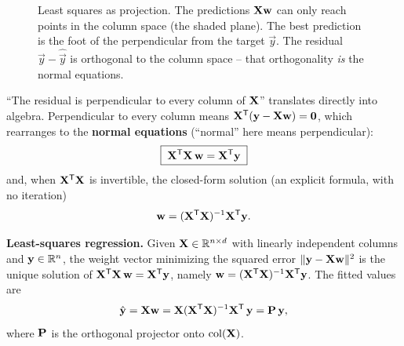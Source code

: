 \begin{figure}[htbp]
\centering
{}
\caption{Least squares as projection. The predictions $\mathbf{X}\mathbf{w}$ can only reach
points in the column space (the shaded plane). The best prediction is the foot of the
perpendicular from the target $\vec{y}$. The residual $\vec{y}-\hat{\vec{y}}$ is
orthogonal to the column space -- that orthogonality \emph{is} the normal equations.}
\label{ch34:fig-projection}
\end{figure}

``The residual is perpendicular to every column of $\mathbf{X}$'' translates directly into
algebra. Perpendicular to every column means $\mathbf{X}^{\mathsf{T}}(\mathbf{y}-\mathbf{X}\mathbf{w}) = \mathbf{0}$,
which rearranges to the \textbf{normal equations} (``normal'' here means perpendicular):
\[
\boxed{\;\mathbf{X}^{\mathsf{T}}\mathbf{X}\,\mathbf{w} = \mathbf{X}^{\mathsf{T}}\mathbf{y}\;}
\]
and, when $\mathbf{X}^{\mathsf{T}}\mathbf{X}$ is invertible, the closed-form solution (an explicit formula,
with no iteration)
\[
\mathbf{w} = (\mathbf{X}^{\mathsf{T}}\mathbf{X})^{-1} \mathbf{X}^{\mathsf{T}} \mathbf{y}.
\]

\begin{formalbox}
\textbf{Least-squares regression.} Given $\mathbf{X}\in\mathbb{R}^{n\times d}$ with linearly
independent columns and $\mathbf{y}\in\mathbb{R}^{n}$, the weight vector minimizing the squared
error $\lVert\mathbf{y}-\mathbf{X}\mathbf{w}\rVert^2$ is the unique solution of
$\mathbf{X}^{\mathsf{T}}\mathbf{X}\,\mathbf{w}=\mathbf{X}^{\mathsf{T}}\mathbf{y}$, namely
$\mathbf{w}=(\mathbf{X}^{\mathsf{T}}\mathbf{X})^{-1}\mathbf{X}^{\mathsf{T}}\mathbf{y}$. The fitted values are
\[
\hat{\mathbf{y}} = \mathbf{X}\mathbf{w} = \mathbf{X}(\mathbf{X}^{\mathsf{T}}\mathbf{X})^{-1}\mathbf{X}^{\mathsf{T}}\,\mathbf{y} =
\mathbf{P}\,\mathbf{y},
\]
where $\mathbf{P}$ is the orthogonal projector onto $\operatorname{col}(\mathbf{X})$.
\end{formalbox}

